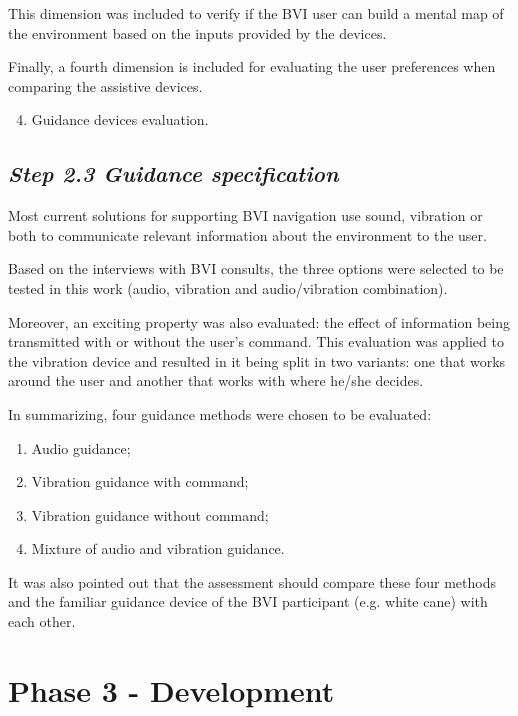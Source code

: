         This dimension was included to verify if the BVI user can build a mental map of the environment based on the inputs provided by the devices.

        Finally, a fourth dimension is included for evaluating the user preferences when comparing the assistive devices.

        \begin{enumerate} [label = \Alph*)]
            \setcounter{enumi}{3}
            \item Guidance devices evaluation.
        \end{enumerate}

    \subsection*{\textit{Step 2.3 Guidance specification}}
        Most current solutions for supporting BVI navigation use sound, vibration or both to communicate relevant information about the environment to the user. 

        Based on the interviews with BVI consults, the three options were selected to be tested in this work (audio, vibration and audio/vibration combination). 

        Moreover, an exciting property was also evaluated: the effect of information being transmitted with or without the user's command. This evaluation was applied to the vibration device and resulted in it being split in two variants: one that works around the user and another that works with where he/she decides.

        In summarizing, four guidance methods were chosen to be evaluated:
        \begin{enumerate} [label = \Alph*)]
            \item Audio guidance;
            \item Vibration guidance with command;
            \item Vibration guidance without command;
            \item Mixture of audio and vibration guidance.
        \end{enumerate}

        It was also pointed out that the assessment should compare these four methods and the familiar guidance device of the BVI participant (e.g. white cane) with each other.
    
    
\section{Phase 3 - Development}
\label{sec:creation_phase}
    
